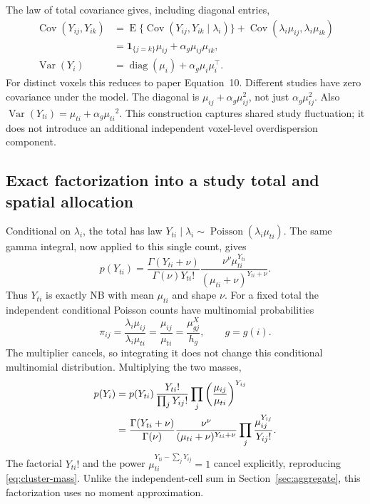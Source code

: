 \documentclass[11pt,a4paper]{article}
\newcommand{\E}{\operatorname{E}}
\newcommand{\Var}{\operatorname{Var}}
\newcommand{\Cov}{\operatorname{Cov}}
\newcommand{\diag}{\operatorname{diag}}
\numberwithin{equation}{section}
\begin{document}
The law of total covariance gives, including diagonal entries,
\begin{align}
 \Cov(Y_{ij},Y_{ik})
 &=\E\{\Cov(Y_{ij},Y_{ik}\mid\lambda_i)\}
   +\Cov(\lambda_i\mu_{ij},\lambda_i\mu_{ik})\\
 &=\mathbf1_{\{j=k\}}\mu_{ij}+\alpha_g\mu_{ij}\mu_{ik},\\
 \Var(Y_i)&=\diag(\mu_i)+\alpha_g\mu_i\mu_i^\top . \label{eq:cluster-variance}
\end{align}
For distinct voxels this reduces to paper Equation~10.
Different studies have zero covariance under the model.
The diagonal is $\mu_{ij}+\alpha_g\mu_{ij}^2$, not just
$\alpha_g\mu_{ij}^2$. Also $\Var(Y_{ti})={\mu_{ti}}+\alpha_g{\mu_{ti}}^2$.
This construction captures shared study fluctuation; it does not introduce
an additional independent voxel-level overdispersion component.

\subsection{Exact factorization into a study total and spatial allocation}
Conditional on $\lambda_i$, the total has law
$Y_{ti}\mid\lambda_i\sim\operatorname{Poisson}(\lambda_i\mu_{ti})$.
The same gamma integral, now applied to this single count, gives
\[
 p(Y_{ti})=
 \frac{\Gamma(Y_{ti}+\nu)}{\Gamma(\nu)Y_{ti}!}
 \frac{\nu^\nu\mu_{ti}^{Y_{ti}}}{(\mu_{ti}+\nu)^{Y_{ti}+\nu}}.
\]
Thus $Y_{ti}$ is exactly NB with mean $\mu_{ti}$ and shape $\nu$.
For a fixed total the independent conditional Poisson counts have
multinomial probabilities
\[
 \pi_{ij}=\frac{\lambda_i\mu_{ij}}{\lambda_i\mu_{ti}}
         =\frac{\mu_{ij}}{\mu_{ti}}
         =\frac{\mu_{gj}^X}{h_g},\qquad g=g(i).
\]
The multiplier cancels, so integrating it does not change this
conditional multinomial distribution. Multiplying the two masses,
\begin{align}
 p(Y_i)
 &=p(Y_{ti})\,\frac{Y_{ti}!}{\prod_jY_{ij}!}
                     \prod_j\left(\frac{\mu_{ij}}{\mu_{ti}}\right)^{Y_{ij}}
 \notag\\
 &=\frac{\Gamma(Y_{ti}+\nu)}{\Gamma(\nu)}
   \frac{\nu^\nu}{(\mu_{ti}+\nu)^{Y_{ti}+\nu}}
   \prod_j\frac{\mu_{ij}^{Y_{ij}}}{Y_{ij}!}.
\end{align}
The factorial $Y_{ti}!$ and the power
$\mu_{ti}^{Y_{ti}-\sum_jY_{ij}}=1$ cancel explicitly, reproducing
\eqref{eq:cluster-mass}. Unlike the independent-cell sum in
Section~\ref{sec:aggregate}, this factorization uses no moment
approximation.
\end{document}
